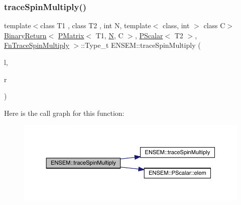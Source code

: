 \subsubsection{\texorpdfstring{traceSpinMultiply()}{traceSpinMultiply()}\hspace{0.1cm}{\footnotesize\ttfamily [2/3]}}
{\footnotesize\ttfamily template$<$class T1 , class T2 , int N, template$<$ class, int $>$ class C$>$ \\
\mbox{\hyperlink{structENSEM_1_1BinaryReturn}{Binary\+Return}}$<$ \mbox{\hyperlink{classENSEM_1_1PMatrix}{P\+Matrix}}$<$ T1, \mbox{\hyperlink{adat__devel_2lib_2hadron_2operator__name__util_8cc_a7722c8ecbb62d99aee7ce68b1752f337}{N}}, C $>$, \mbox{\hyperlink{classENSEM_1_1PScalar}{P\+Scalar}}$<$ T2 $>$, \mbox{\hyperlink{structENSEM_1_1FnTraceSpinMultiply}{Fn\+Trace\+Spin\+Multiply}} $>$\+::Type\+\_\+t E\+N\+S\+E\+M\+::trace\+Spin\+Multiply (\begin{DoxyParamCaption}\item[{const \mbox{\hyperlink{classENSEM_1_1PMatrix}{P\+Matrix}}$<$ T1, \mbox{\hyperlink{adat__devel_2lib_2hadron_2operator__name__util_8cc_a7722c8ecbb62d99aee7ce68b1752f337}{N}}, C $>$ \&}]{l,  }\item[{const \mbox{\hyperlink{classENSEM_1_1PScalar}{P\+Scalar}}$<$ T2 $>$ \&}]{r }\end{DoxyParamCaption})\hspace{0.3cm}{\ttfamily [inline]}}

Here is the call graph for this function\+:\nopagebreak
\begin{figure}[H]
\begin{center}
\leavevmode
\includegraphics[width=350pt]{df/d0a/group__primmatrix_gab5fbf23688b38c3209c80d2a9a22b3d0_cgraph}
\end{center}
\end{figure}
\mbox{\label{group__primmatrix_gafb9febbc048f38bb6e1dc7d60d8dde8d}} 
